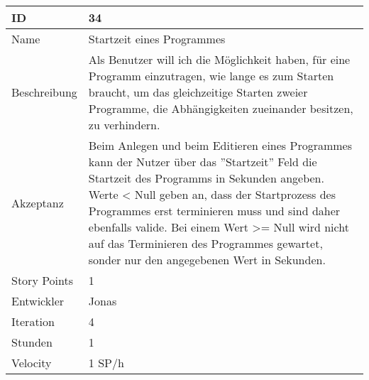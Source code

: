 \begin{table}[htbp]
    \begin{minipage}{\linewidth}
        \setlength{\tymax}{0.5\linewidth}
        \centering
        \small
        \begin{tabulary}{\textwidth}{|l|p{10cm}|} \hline
            ID   &34\\\hline
            Name  &Startzeit eines Programmes\\\hline
	    Beschreibung&Als Benutzer will ich die Möglichkeit haben, für eine Programm einzutragen, wie lange es zum Starten braucht, um das gleichzeitige Starten zweier Programme, die Abhängigkeiten zueinander besitzen, zu verhindern.\\\hline
	    Akzeptanz &Beim Anlegen und beim Editieren eines Programmes kann der Nutzer über das ''Startzeit'' Feld die Startzeit des Programms in Sekunden angeben. Werte < Null geben an, dass der Startprozess des Programmes erst terminieren muss und sind daher ebenfalls valide. Bei einem Wert >= Null wird nicht auf das Terminieren des Programmes gewartet, sonder nur den angegebenen Wert in Sekunden.\\\hline
            Story Points&1\\\hline
            Entwickler &Jonas\\\hline
            Iteration &4\\\hline
            Stunden  &1\\\hline
            Velocity &1 SP\slash h\\\hline
        \end{tabulary}
    \end{minipage}
\end{table}



